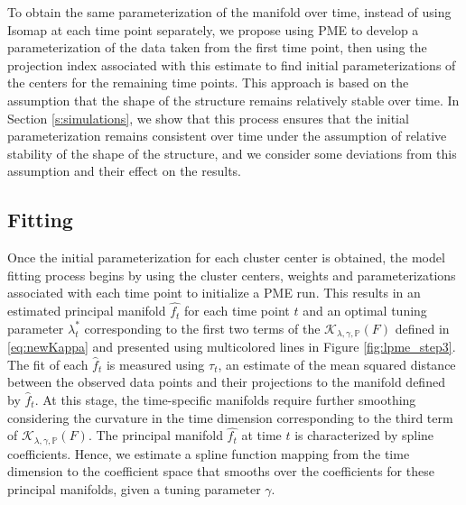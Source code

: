 \documentclass[11pt,reqno]{article}
\theoremstyle{definition}
\begin{document}

To obtain the same parameterization of the manifold over time, instead of using Isomap at each time point separately, we propose using PME to develop a parameterization of the data taken from the first time point, then using the projection index associated with this estimate to find initial parameterizations of the centers for the remaining time points. This approach is based on the assumption that the shape of the structure remains relatively stable over time. In Section \ref{s:simulations}, we show that this process ensures that the initial parameterization remains consistent over time under the assumption of relative stability of the shape of the structure, and we consider some deviations from this assumption and their effect on the results.

\subsection*{Fitting}

Once the initial parameterization for each cluster center is obtained, the model fitting process begins by using the cluster centers, weights and parameterizations associated with each time point to initialize a PME run. This results in an estimated principal manifold $\widehat{f_t}$ for each time point $t$ and an optimal tuning parameter $\lambda_t^*$ corresponding to the first two terms of the $\mathcal{K}_{\lambda, \gamma, \mathbb{P}}(F)$ defined in \eqref{eq:newKappa} and presented using multicolored lines in Figure \ref{fig:lpme_step3}. The fit of each $\hat{f}_t$ is measured using $\tau_t$, an estimate of the mean squared distance between the observed data points and their projections to the manifold defined by $\hat{f}_t$. At this stage, the time-specific manifolds require further smoothing considering the curvature in the time dimension corresponding to the third term of $\mathcal{K}_{\lambda, \gamma, \mathbb{P}}(F)$. The principal manifold $\widehat{f_t}$ at time $t$ is characterized by spline coefficients. Hence, we estimate a spline function mapping from the time dimension to the coefficient space that smooths over the coefficients for these principal manifolds, given a tuning parameter $\gamma$.
\end{document}
